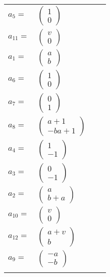 \documentclass[1p]{elsarticle_modified}
\theoremstyle{definition}
\begin{document}
\begin{tabular}{m{7pt} m{180pt} m{7pt} m{180pt} }
\flushright $a_{5}=$&$\begin{pmatrix}1\\0\end{pmatrix}$ \\
\flushright $a_{11}=$&$\begin{pmatrix}v\\0\end{pmatrix}$ \\
\flushright $a_{1}=$&$\begin{pmatrix}a\\b\end{pmatrix}$ \\
\flushright $a_{6}=$&$\begin{pmatrix}1\\0\end{pmatrix}$ \\
\flushright $a_{7}=$&$\begin{pmatrix}0\\1\end{pmatrix}$ \\
\flushright $a_{8}=$&$\begin{pmatrix}a+1\\- b a+1\end{pmatrix}$ \\
\flushright $a_{4}=$&$\begin{pmatrix}1\\-1\end{pmatrix}$ \\
\flushright $a_{3}=$&$\begin{pmatrix}0\\-1\end{pmatrix}$ \\
\flushright $a_{2}=$&$\begin{pmatrix}a\\b+a\end{pmatrix}$ \\
\flushright $a_{10}=$&$\begin{pmatrix}v\\0\end{pmatrix}$ \\
\flushright $a_{12}=$&$\begin{pmatrix}a+v\\b\end{pmatrix}$ \\
\flushright $a_{9}=$&$\begin{pmatrix}- a\\- b\end{pmatrix}$\\&\end{tabular}
\end{document}
